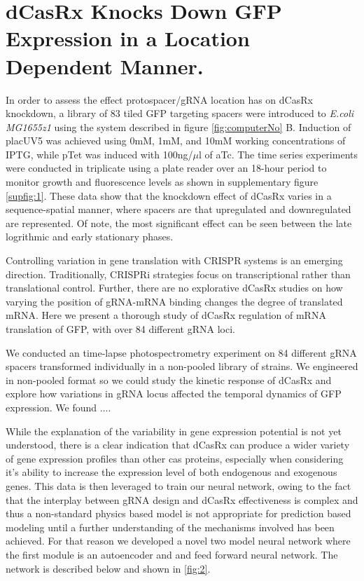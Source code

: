 \documentclass[times]{zHenriquesLab-StyleBioRxiv}
\begin{document}
\section*{dCasRx Knocks Down GFP Expression in a Location Dependent Manner.}
In order to assess the effect protospacer/gRNA location has on dCasRx knockdown, a library of 83 tiled GFP targeting spacers were introduced to {\it E.coli MG1655z1} using the system described in figure \ref{fig:computerNo} B. Induction of placUV5 was achieved using 0mM, 1mM, and 10mM working concentrations of IPTG, while pTet was induced with 100ng/$\mu$l of aTc. The time series experiments were conducted in triplicate using a plate reader over an 18-hour period to monitor growth and fluorescence levels as shown in supplementary figure \ref{supfig:1}. These data show that the knockdown effect of dCasRx varies in a sequence-spatial manner, where spacers are that upregulated and downregulated are represented. Of note, the most significant effect can be seen between the late logrithmic and early stationary phases. 

Controlling variation in gene translation with CRISPR systems is an emerging direction.  Traditionally, CRISPRi strategies focus on transcriptional rather than translational control.  Further, there are no explorative dCasRx studies on how varying the position of gRNA-mRNA binding changes the degree of translated mRNA.  Here we present a thorough study of dCasRx regulation of mRNA translation of GFP, with over 84 different gRNA loci. 

We conducted an time-lapse photospectrometry experiment on 84 different gRNA spacers transformed individually in a non-pooled library of strains.  We engineered in non-pooled format so we could study the kinetic response of dCasRx and explore how variations in gRNA locus affected the temporal dynamics of GFP expression.  We found .... 


While the explanation of the variability in gene expression potential is not yet understood, there is a clear indication that dCasRx can produce a wider variety of gene expression profiles than other cas proteins, especially when considering it's ability to increase the expression level of both endogenous and exogenous genes. This data is then leveraged to train our neural network, owing to the fact that the interplay between gRNA design and dCasRx effectiveness is complex and thus a non-standard physics based model is not appropriate for prediction based modeling until a further understanding of the mechanisms involved has been achieved. For that reason we developed a novel two model neural network where the first module is an autoencoder and and feed forward neural network. The network is described below and shown in \ref{fig:2}.
\end{document}
